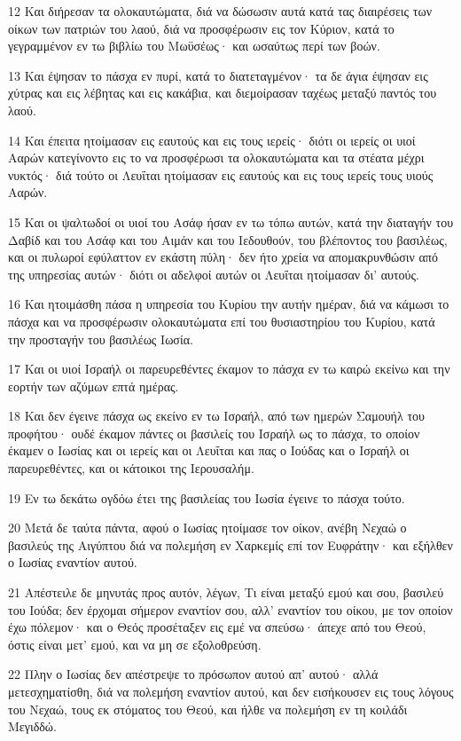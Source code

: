 \par 12 Και διήρεσαν τα ολοκαυτώματα, διά να δώσωσιν αυτά κατά τας διαιρέσεις των οίκων των πατριών του λαού, διά να προσφέρωσιν εις τον Κύριον, κατά το γεγραμμένον εν τω βιβλίω του Μωϋσέως· και ωσαύτως περί των βοών.
\par 13 Και έψησαν το πάσχα εν πυρί, κατά το διατεταγμένον· τα δε άγια έψησαν εις χύτρας και εις λέβητας και εις κακάβια, και διεμοίρασαν ταχέως μεταξύ παντός του λαού.
\par 14 Και έπειτα ητοίμασαν εις εαυτούς και εις τους ιερείς· διότι οι ιερείς οι υιοί Ααρών κατεγίνοντο εις το να προσφέρωσι τα ολοκαυτώματα και τα στέατα μέχρι νυκτός· διά τούτο οι Λευΐται ητοίμασαν εις εαυτούς και εις τους ιερείς τους υιούς Ααρών.
\par 15 Και οι ψαλτωδοί οι υιοί του Ασάφ ήσαν εν τω τόπω αυτών, κατά την διαταγήν του Δαβίδ και του Ασάφ και του Αιμάν και του Ιεδουθούν, του βλέποντος του βασιλέως, και οι πυλωροί εφύλαττον εν εκάστη πύλη· δεν ήτο χρεία να απομακρυνθώσιν από της υπηρεσίας αυτών· διότι οι αδελφοί αυτών οι Λευΐται ητοίμασαν δι' αυτούς.
\par 16 Και ητοιμάσθη πάσα η υπηρεσία του Κυρίου την αυτήν ημέραν, διά να κάμωσι το πάσχα και να προσφέρωσιν ολοκαυτώματα επί του θυσιαστηρίου του Κυρίου, κατά την προσταγήν του βασιλέως Ιωσία.
\par 17 Και οι υιοί Ισραήλ οι παρευρεθέντες έκαμον το πάσχα εν τω καιρώ εκείνω και την εορτήν των αζύμων επτά ημέρας.
\par 18 Και δεν έγεινε πάσχα ως εκείνο εν τω Ισραήλ, από των ημερών Σαμουήλ του προφήτου· ουδέ έκαμον πάντες οι βασιλείς του Ισραήλ ως το πάσχα, το οποίον έκαμεν ο Ιωσίας και οι ιερείς και οι Λευΐται και πας ο Ιούδας και ο Ισραήλ οι παρευρεθέντες, και οι κάτοικοι της Ιερουσαλήμ.
\par 19 Εν τω δεκάτω ογδόω έτει της βασιλείας του Ιωσία έγεινε το πάσχα τούτο.
\par 20 Μετά δε ταύτα πάντα, αφού ο Ιωσίας ητοίμασε τον οίκον, ανέβη Νεχαώ ο βασιλεύς της Αιγύπτου διά να πολεμήση εν Χαρκεμίς επί τον Ευφράτην· και εξήλθεν ο Ιωσίας εναντίον αυτού.
\par 21 Απέστειλε δε μηνυτάς προς αυτόν, λέγων, Τι είναι μεταξύ εμού και σου, βασιλεύ του Ιούδα; δεν έρχομαι σήμερον εναντίον σου, αλλ' εναντίον του οίκου, με τον οποίον έχω πόλεμον· και ο Θεός προσέταξεν εις εμέ να σπεύσω· άπεχε από του Θεού, όστις είναι μετ' εμού, και να μη σε εξολοθρεύση.
\par 22 Πλην ο Ιωσίας δεν απέστρεψε το πρόσωπον αυτού απ' αυτού· αλλά μετεσχηματίσθη, διά να πολεμήση εναντίον αυτού, και δεν εισήκουσεν εις τους λόγους του Νεχαώ, τους εκ στόματος του Θεού, και ήλθε να πολεμήση εν τη κοιλάδι Μεγιδδώ.
